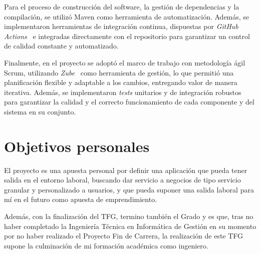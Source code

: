 Para el proceso de construcción del software, la gestión de dependencias y la compilación, se utilizó Maven como herramienta de automatización. Además, se implementaron herramientas de integración continua, dispuestas por \textit{GitHub Actions}~\cite{github-actions} e integradas directamente con el repositorio para garantizar un control de calidad constante y automatizado.

Finalmente, en el proyecto se adoptó el marco de trabajo con metodología ágil Scrum, utilizando \textit{Zube}~\cite{zube} como herramienta de gestión, lo que permitió una planificación flexible y adaptable a los cambios, entregando valor de manera iterativa. Además, se implementaron \emph{tests} unitarios y de integración robustos para garantizar la calidad y el correcto funcionamiento de cada componente y del sistema en su conjunto.

\section{Objetivos personales}\label{objetivos-personales}
El proyecto es una apuesta personal por definir una aplicación que pueda tener salida en el entorno laboral, buscando dar servicio a negocios de tipo servicio granular y personalizado a usuarios, y que pueda suponer una salida laboral para mí en el futuro como apuesta de emprendimiento.

Además, con la finalización del TFG, termino también el Grado y es que, tras no haber completado la Ingeniería Técnica en Informática de Gestión en su momento por no haber realizado el Proyecto Fin de Carrera, la realización de este TFG supone la culminación de mi formación académica como ingeniero.